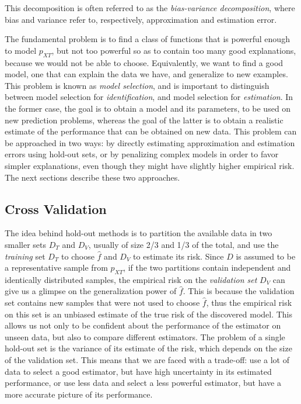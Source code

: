 \documentclass[a4paper]{book}
\begin{document}
This decomposition is often referred to as the \emph{bias-variance decomposition}, where bias and variance refer to, respectively, approximation and estimation error.

The fundamental problem is to find a class of functions that is powerful enough to model $p_{XT}$, but not too powerful so as to contain too many good explanations, because we would not be able to choose. Equivalently, we want to find a good model, one that can explain the data we have, and generalize to new examples. This problem is known as \emph{model selection}, and is important to distinguish between model selection for \emph{identification}, and model selection for \emph{estimation}. In the former case, the goal is to obtain a model and its parameters, to be used on new prediction problems, whereas the goal of the latter is to obtain a realistic estimate of the performance that can be obtained on new data. This problem can be approached in two ways: by directly estimating approximation and estimation errors using hold-out sets, or by penalizing complex models in order to favor simpler explanations, even though they might have slightly higher empirical risk. The next sections describe these two approaches.


\subsection{Cross Validation}
\label{sec:cv}
The idea behind hold-out methods is to partition the available data in two smaller sets $D_T$ and $D_V$, usually of size 2/3 and 1/3 of the total, and use the \emph{training} set $D_T$ to choose $\hat{f}$ and $D_V$ to estimate its risk. Since $D$ is assumed to be a representative sample from $p_{XT}$, if the two partitions contain independent and identically distributed samples, the empirical risk on the \emph{validation set} $D_V$ can give us a glimpse on the generalization power of $\hat{f}$. This is because the validation set contains new samples that were not used to choose $\hat{f}$, thus the empirical risk on this set is an unbiased estimate of the true risk of the discovered model. This allows us not only to be confident about the performance of the estimator on unseen data, but also to compare different estimators. The problem of a single hold-out set is the variance of its estimate of the risk, which depends on the size of the validation set. This means that we are faced with a trade-off: use a lot of data to select a good estimator, but have high uncertainty in its estimated performance, or use less data and select a less powerful estimator, but have a more accurate picture of its performance.
\end{document}
